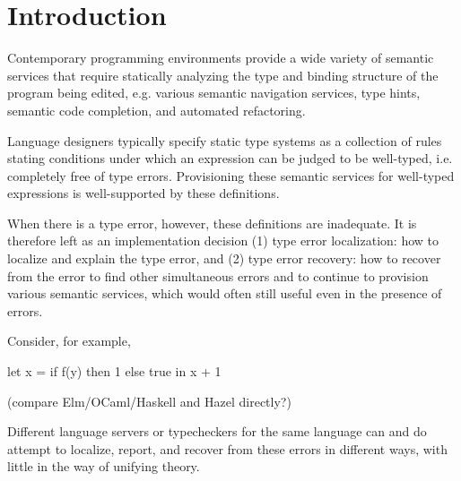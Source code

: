 \section{Introduction}
\label{sec:introduction}


Contemporary programming environments provide 
a wide variety of semantic services that require statically analyzing the type and binding structure of the program being edited, e.g. various semantic navigation services, type hints, semantic code completion, and automated refactoring. 

Language designers typically specify static type systems as a collection of rules 
stating conditions under which an expression can be judged to be well-typed,
i.e. completely free of type errors. 
Provisioning these semantic services for well-typed expressions is well-supported 
by these definitions. 

When there is a type error, however, these definitions are inadequate. It is therefore left as an implementation decision (1) type error localization: how to localize and explain the type error, and (2) type error recovery: how to recover from the error to find other simultaneous errors and to continue to provision various semantic services, which would often still useful even in the presence of errors. 

Consider, for example, 

let x = 
  if f(y) then 1 else true
in 
  x + 1


(compare Elm/OCaml/Haskell and Hazel directly?)

Different language servers or typecheckers for the same language can and do attempt to localize, report, and recover from these errors in different ways, with little in the way of unifying theory. 

